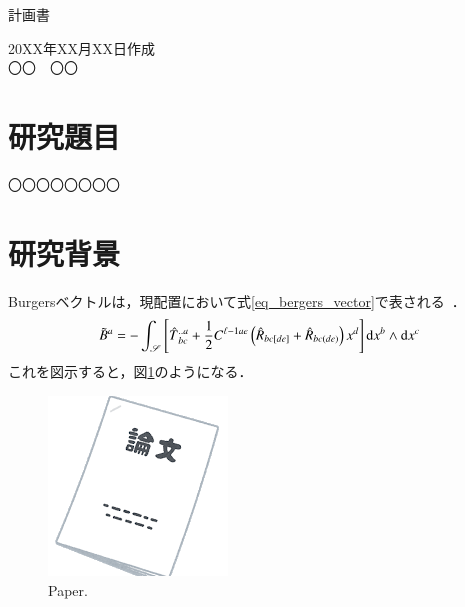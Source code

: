 \documentclass[a4j,10ptj,fleqn]{ltjsarticle}  %
\begin{document}

\begin{center}
{計画書}
\end{center}
\vspace{0.3cm}
\begin{flushright}
{20XX年XX月XX日作成}
\\
{〇〇　〇〇}
\end{flushright}

\section{研究題目}
〇〇〇〇〇〇〇〇

\section{研究背景}
Burgersベクトルは，現配置において式\eqref{eq_bergers_vector}で表される~\cite{kondo1955non-riemannian}．
%
\begin{equation}
  \label{eq_bergers_vector}
    \tilde{B}{}^{a}
    = -\int_{\mathscr{S}} \left[ \hat{T}{}^{..a}_{bc} + \frac{1}{2} C^{\ell{}-1ae}
      \left( \hat{R}{}_{bc[de]} + \hat{R}{}_{bc(de)} \right) x^{d} \right] \mathrm{d} x^{b} \wedge \mathrm{d} x^{c}
  \dotfill
\end{equation}
%
これを図示すると，図\ref{fig_paper_irasutoya}のようになる．
%
\begin{figure}[bp]
    \centering
    \includegraphics{./figure/document_ronbun_taba.png}
    \caption{Paper.}
    \label{fig_paper_irasutoya}
\end{figure}
%



\end{document}

